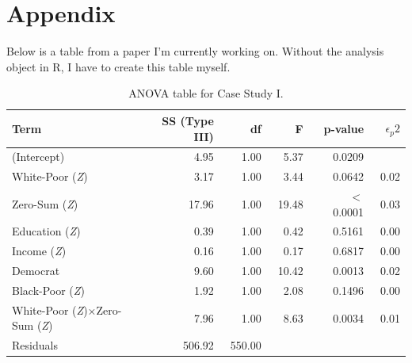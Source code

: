 \documentclass{article}\usepackage[]{graphicx}\usepackage[]{xcolor}
\begin{document}
\newpage
\onecolumn
\section{Appendix}

Below is a table from a paper I’m currently working on. Without the analysis object in R, I have to create this table myself.

\begin{table}[H]
\begin{center}
\begin{tabular}{l r r r r r }
\hline Term & \ SS (Type III) & \ df & \ F & \ p-value & \ $\epsilon_p2$ \\
\hline (Intercept) & \ 4.95 & \ 1.00 & \ 5.37 & \ 0.0209 & \  \\
White-Poor (\textit{Z}) & \ 3.17 & \ 1.00 & \ 3.44 & \ 0.0642 & \ 0.02 \\
Zero-Sum (\textit{Z}) & \ 17.96 & \ 1.00 & \ 19.48 & \ $<$ 0.0001 & \ 0.03 \\
Education (\textit{Z}) & \ 0.39 & \ 1.00 & \ 0.42 & \ 0.5161 & \ 0.00 \\
Income (\textit{Z}) & \ 0.16 & \ 1.00 & \ 0.17 & \ 0.6817 & \ 0.00 \\
Democrat & \ 9.60 & \ 1.00 & \ 10.42 & \ 0.0013 & \ 0.02 \\
Black-Poor (\textit{Z}) & \ 1.92 & \ 1.00 & \ 2.08 & \ 0.1496 & \ 0.00 \\
White-Poor (\textit{Z})×Zero-Sum (\textit{Z}) & \ 7.96 & \ 1.00 & \ 8.63 & \ 0.0034 & \ 0.01 \\
Residuals & \ 506.92 & \ 550.00 & \  & \  & \  \\
\hline
\end{tabular} 
\caption{ANOVA table for Case Study I.}
\label{full.sleep.tab}
\end{center}
\end{table}
\end{document}
